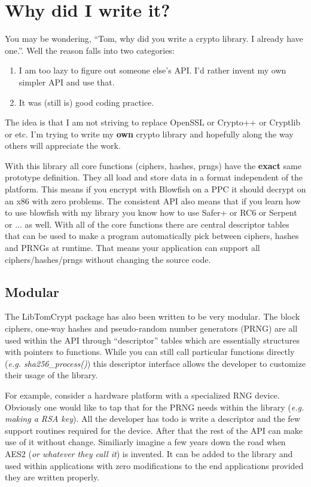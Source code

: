 \documentclass{book}
\begin{document}
\section{Why did I write it?}
You may be wondering, ``Tom, why did you write a crypto library.  I already have one.''.  Well the reason falls into
two categories:
\begin{enumerate}
    \item I am too lazy to figure out someone else's API.  I'd rather invent my own simpler API and use that.
    \item It was (still is) good coding practice.
\end{enumerate}

The idea is that I am not striving to replace OpenSSL or Crypto++ or Cryptlib or etc.  I'm trying to write my 
{\bf own} crypto library and hopefully along the way others will appreciate the work.

With this library all core functions (ciphers, hashes, prngs) have the {\bf exact} same prototype definition.  They all load
and store data in a format independent of the platform.  This means if you encrypt with Blowfish on a PPC it should decrypt
on an x86 with zero problems.  The consistent API also means that if you learn how to use blowfish with my library you 
know how to use Safer+ or RC6 or Serpent or ... as well.  With all of the core functions there are central descriptor tables 
that can be used to make a program automatically pick between ciphers, hashes and PRNGs at runtime.  That means your 
application can support all ciphers/hashes/prngs without changing the source code.

\subsection{Modular}
The LibTomCrypt package has also been written to be very modular.  The block ciphers, one-way hashes and
pseudo-random number generators (PRNG) are all used within the API through ``descriptor'' tables which 
are essentially structures with pointers to functions.  While you can still call particular functions
directly (\textit{e.g. sha256\_process()}) this descriptor interface allows the developer to customize their
usage of the library.

For example, consider a hardware platform with a specialized RNG device.  Obviously one would like to tap
that for the PRNG needs within the library (\textit{e.g. making a RSA key}).  All the developer has todo
is write a descriptor and the few support routines required for the device.  After that the rest of the 
API can make use of it without change.  Similiarly imagine a few years down the road when AES2 (\textit{or whatever they call it}) is
invented.  It can be added to the library and used within applications with zero modifications to the
end applications provided they are written properly.
\end{document}
